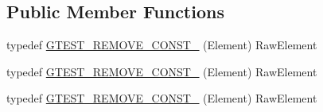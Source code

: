 \subsection*{Public Member Functions}
\begin{DoxyCompactItemize}
\item 
typedef \mbox{\hyperlink{classtesting_1_1internal_1_1_stl_container_view_3_01_element[_n]_4_af8c1aa62de6f8a5d3126c7b3badfefdb}{G\+T\+E\+S\+T\+\_\+\+R\+E\+M\+O\+V\+E\+\_\+\+C\+O\+N\+S\+T\+\_\+}} (Element) Raw\+Element
\item 
typedef \mbox{\hyperlink{classtesting_1_1internal_1_1_stl_container_view_3_01_element[_n]_4_af8c1aa62de6f8a5d3126c7b3badfefdb}{G\+T\+E\+S\+T\+\_\+\+R\+E\+M\+O\+V\+E\+\_\+\+C\+O\+N\+S\+T\+\_\+}} (Element) Raw\+Element
\item 
typedef \mbox{\hyperlink{classtesting_1_1internal_1_1_stl_container_view_3_01_element[_n]_4_af8c1aa62de6f8a5d3126c7b3badfefdb}{G\+T\+E\+S\+T\+\_\+\+R\+E\+M\+O\+V\+E\+\_\+\+C\+O\+N\+S\+T\+\_\+}} (Element) Raw\+Element
\end{DoxyCompactItemize}
